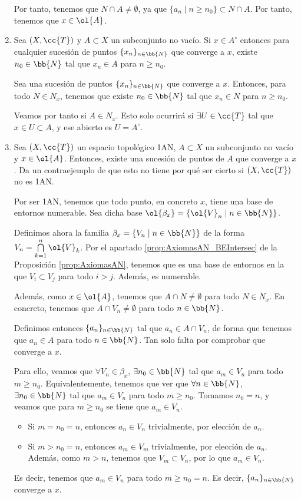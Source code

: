 \begin{ejercicio}
\begin{enumerate}[label=\alph*)]
        Por tanto, tenemos que $N\cap A\neq \emptyset$, ya que $\{a_n\mid n\geq n_0\}\subset N\cap A$. Por tanto, tenemos que $x\in \ol{A}$.

        \item Sea $(X,\cc{T})$ y $A\subset X$ un subconjunto no vacío. Si $x\in A^\circ$ entonces para cualquier sucesión de puntos $\{x_n\}_{n\in \bb{N}}$ que converge a $x$, existe $n_0\in \bb{N}$ tal que $x_n\in A$ para $n\geq n_0$.

        Sea una sucesión de puntos $\{x_n\}_{n\in \bb{N}}$ que converge a $x$. Entonces, para todo $N\in N_x$, tenemos que existe $n_0\in \bb{N}$ tal que $x_n\in N$ para $n\geq n_0$.

        Veamos por tanto si $A\in N_x$. Esto solo ocurrirá si $\exists U\in \cc{T}$ tal que $x\in U\subset A$, y ese abierto es $U=A^\circ$.

        \item Sea $(X,\cc{T})$ un espacio topológico 1AN, $A\subset X$ un subconjunto no vacío y $x\in \ol{A}$. Entonces, existe una sucesión de puntos de $A$ que converge a $x$. Da un contraejemplo de que esto no tiene por qué ser cierto si $(X,\cc{T})$ no es 1AN.

        Por ser 1AN, tenemos que todo punto, en concreto $x$, tiene una base de entornos numerable. Sea dicha base $\ol{\beta_x}=\{\ol{V}_n\mid n\in \bb{N}\}$.

        Definimos ahora la familia $\beta_x=\{V_n \mid n\in \bb{N}\}$ de la forma $V_n=\bigcap\limits_{k=1}^n \ol{V}_k$. Por el apartado \ref{prop:AxiomasAN_BEIntersec} de la Proposición \ref{prop:AxiomasAN}, tenemos que es una base de entornos en la que $V_i\subset V_j$ para todo $i>j$. Además, es numerable.        

        Además, como $x\in \ol{A}$, tenemos que $A\cap N\neq \emptyset$ para todo $N\in N_x$. En concreto, tenemos que $A\cap V_n\neq \emptyset$ para todo $n\in \bb{N}$.

        Definimos entonces $\{a_n\}_{n\in \bb{N}}$ tal que $a_n\in A\cap V_n$, de forma que tenemos que $a_n\in A$ para todo $n\in \bb{N}$. Tan solo falta por comprobar que converge a $x$.

        Para ello, veamos que $\forall V_n\in \beta_x$, $\exists n_0\in\bb{N}$ tal que $a_m\in V_n$ para todo $m\geq n_0$. Equivalentemente, tenemos que ver que $\forall n\in \bb{N}$, $\exists n_0\in \bb{N}$ tal que $a_m\in V_n$ para todo $m\geq n_0$. Tomamos $n_0=n$, y veamos que para $m\geq n_0$ se tiene que $a_m\in V_n$.
        \begin{itemize}
            \item Si $m=n_0=n$, entonces $a_n\in V_n$ trivialmente, por elección de $a_n$.
            \item Si $m>n_0=n$, entonces $a_m\in V_m$ trivialmente, por elección de $a_n$. Además, como $m>n$, tenemos que $V_m\subset V_n$, por lo que $a_m\in V_n$.
        \end{itemize}
        Es decir, tenemos que $a_m\in V_n$ para todo $m\geq n_0=n$. Es decir, $\{a_n\}_{n\in \bb{N}}$ converge a $x$.\\



\end{enumerate}
\end{ejercicio}
